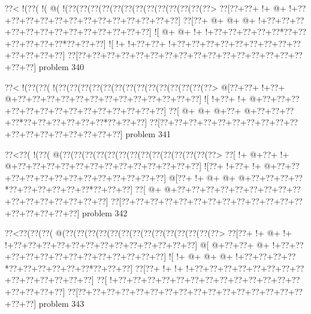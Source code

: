 \vbox{\vbox{\goo
\0??<\- !(\0??(\- !(\- @(\- !(\0??(\0??(\0??(\0??(\0??(\0??(\0??(\0??(\0??(\0??(\0??(\0??(\0??>
\0??[\0??+\0??+\- !+\- @+\- !+\0??+\0??+\0??+\0??+\0??+\0??+\0??+\0??+\0??+\0??+\0??+\0??+\0??]
\0??[\0??+\- @+\- @+\- @+\- !+\0??+\0??+\0??+\0??+\0??+\0??+\0??+\0??+\0??+\0??+\0??+\0??+\0??]
\- ![\- @+\- @+\- !+\- !+\0??+\0??+\0??+\0??+\0??*\0??+\0??+\0??+\0??+\0??+\0??*\0??+\0??+\0??]
\- ![\- !+\- !+\0??+\0??+\- !+\0??+\0??+\0??+\0??+\0??+\0??+\0??+\0??+\0??+\0??+\0??+\0??+\0??]
\0??[\0??+\0??+\0??+\0??+\0??+\0??+\0??+\0??+\0??+\0??+\0??+\0??+\0??+\0??+\0??+\0??+\0??+\0??]
}
\hfil problem 340\hfil\break
}



\vbox{\vbox{\goo
\0??<\- !(\0??(\0??(\- !(\0??(\0??(\0??(\0??(\0??(\0??(\0??(\0??(\0??(\0??(\0??(\0??(\0??(\0??>
\- @[\0??+\0??+\- !+\0??+\- @+\0??+\0??+\0??+\0??+\0??+\0??+\0??+\0??+\0??+\0??+\0??+\0??+\0??]
\- ![\- !+\0??+\- !+\- @+\0??+\0??+\0??+\0??+\0??+\0??+\0??+\0??+\0??+\0??+\0??+\0??+\0??+\0??]
\0??[\- @+\- @+\- @+\0??+\- @+\0??+\0??+\0??+\0??*\0??+\0??+\0??+\0??+\0??+\0??*\0??+\0??+\0??]
\0??[\0??+\0??+\0??+\0??+\0??+\0??+\0??+\0??+\0??+\0??+\0??+\0??+\0??+\0??+\0??+\0??+\0??+\0??]
}
\hfil problem 341\hfil\break
}



\vbox{\vbox{\goo
\0??<\0??(\- !(\0??(\- @(\0??(\0??(\0??(\0??(\0??(\0??(\0??(\0??(\0??(\0??(\0??(\0??(\0??(\0??>
\0??[\- !+\- @+\0??+\- !+\- @+\0??+\0??+\0??+\0??+\0??+\0??+\0??+\0??+\0??+\0??+\0??+\0??+\0??]
\- ![\0??+\- !+\0??+\- !+\- @+\0??+\0??+\0??+\0??+\0??+\0??+\0??+\0??+\0??+\0??+\0??+\0??+\0??]
\- @[\0??+\- !+\- @+\- @+\- @+\0??+\0??+\0??+\0??*\0??+\0??+\0??+\0??+\0??+\0??*\0??+\0??+\0??]
\0??[\- @+\- @+\0??+\0??+\0??+\0??+\0??+\0??+\0??+\0??+\0??+\0??+\0??+\0??+\0??+\0??+\0??+\0??]
\0??[\0??+\0??+\0??+\0??+\0??+\0??+\0??+\0??+\0??+\0??+\0??+\0??+\0??+\0??+\0??+\0??+\0??+\0??]
}
\hfil problem 342\hfil\break
}



\vbox{\vbox{\goo
\0??<\0??(\0??(\0??(\- @(\0??(\0??(\0??(\0??(\0??(\0??(\0??(\0??(\0??(\0??(\0??(\0??(\0??(\0??>
\0??[\0??+\- !+\- @+\- !+\- !+\0??+\0??+\0??+\0??+\0??+\0??+\0??+\0??+\0??+\0??+\0??+\0??+\0??]
\- @[\- @+\0??+\0??+\- @+\- !+\0??+\0??+\0??+\0??+\0??+\0??+\0??+\0??+\0??+\0??+\0??+\0??+\0??]
\- ![\- !+\- @+\- @+\- @+\- !+\0??+\0??+\0??+\0??*\0??+\0??+\0??+\0??+\0??+\0??*\0??+\0??+\0??]
\0??[\0??+\- !+\- !+\- !+\0??+\0??+\0??+\0??+\0??+\0??+\0??+\0??+\0??+\0??+\0??+\0??+\0??+\0??]
\0??[\- !+\0??+\0??+\0??+\0??+\0??+\0??+\0??+\0??+\0??+\0??+\0??+\0??+\0??+\0??+\0??+\0??+\0??]
\0??[\0??+\0??+\0??+\0??+\0??+\0??+\0??+\0??+\0??+\0??+\0??+\0??+\0??+\0??+\0??+\0??+\0??+\0??]
}
\hfil problem 343\hfil\break
}



